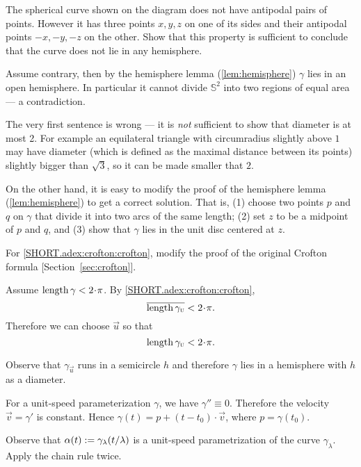 The spherical curve shown on the diagram does not have antipodal pairs of points.
However it has three points $x,y,z$ on one of its sides and their antipodal points $-x,-y,-z$ on the other.
Show that this property is sufficient to conclude that the curve does not lie in any hemisphere.

Assume contrary, then by the hemisphere lemma (\ref{lem:hemisphere}) $\gamma$ lies in an open hemisphere.
In particular it cannot divide $\mathbb{S}^2$ into two regions of equal area --- a contradiction.

The very first sentence is wrong --- it is {}\emph{not} sufficient to show that diameter is at most 2.
For example an equilateral triangle with circumradius slightly above $1$ may have diameter (which is defined as the maximal distance between its points) slightly bigger than $\sqrt3$, so it can be made smaller that $2$.

On the other hand, it is easy to modify the proof of the hemisphere lemma (\ref{lem:hemisphere}) to get a correct solution.
That is, (1) choose two points $p$ and $q$ on $\gamma$ that divide it into two arcs of the same length;
(2) set $z$ to be a midpoint of $p$ and $q$,
and (3) show that $\gamma$ lies in the unit disc centered at $z$.


For \ref{SHORT.adex:crofton:crofton}, modify the proof of the original Crofton formula
[Section~\ref{sec:crofton}].

Assume $\length \gamma<2\cdot\pi$.
By \ref{SHORT.adex:crofton:crofton},
\[\overline{\length \gamma_{\vec u}}<2\cdot\pi.\]
Therefore we can choose ${\vec u}$ so that 
\[\length \gamma_{\vec u}<2\cdot\pi.\]

Observe that $\gamma_{\vec u}$ runs in a semicircle $h$ and therefore $\gamma$ lies in a hemisphere with $h$ as a diameter.

\setcounter{eqtn}{0}


For a unit-speed parameterization $\gamma$, we have $\gamma''\equiv 0$.
Therefore the velocity $\vec v=\gamma'$ is constant.
Hence $\gamma(t)=p+(t-t_0)\cdot \vec v$, where $p=\gamma(t_0)$.


Observe that $\alpha(t):=\gamma_{\lambda}(t/\lambda)$ is a unit-speed parametrization of the curve $ \gamma_{\lambda}$.
Apply the chain rule twice.


